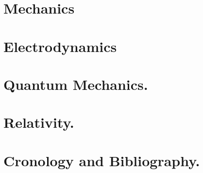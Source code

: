 \documentclass[12pt,leqno]{book}
\begin{document}
\part{Mechanics}












\part{Electrodynamics}


\part{Quantum Mechanics.}











\part{Relativity.}











\part{Cronology and Bibliography.}





\end{document}
